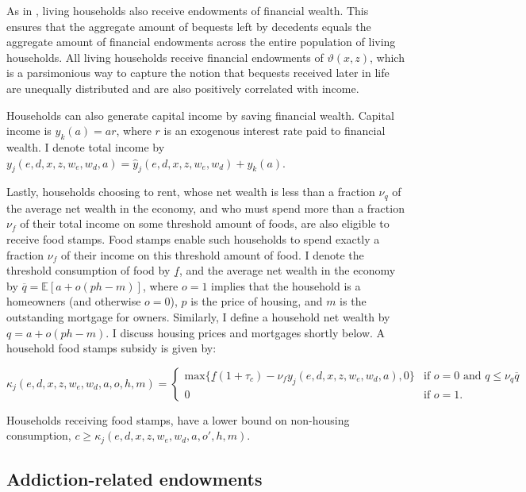 \documentclass[parskip=full]{article}
\begin{document}
As in \citet{kkk-2021}, living households also receive endowments of financial wealth. This ensures that the aggregate amount of bequests left by decedents equals the aggregate amount of financial endowments across the entire population of living households. All living households receive financial endowments of $\vartheta (x,z)$, which is a parsimonious way to capture the notion that bequests received later in life are unequally distributed and are also positively correlated with income.

Households can also generate capital income by saving financial wealth. Capital income is $y_{k}(a)=ar$, where $r$ is an exogenous interest rate paid to financial wealth. I denote total income by $y_{j}(e,d,x,z,w_{e},w_{d},a)=\hat{y}_{j}(e,d,x,z,w_{e},w_{d})+y_{k}(a)$.

Lastly, households choosing to rent, whose net wealth is less than a fraction $\nu_{q}$ of the average net wealth in the economy, and who must spend more than a fraction $\nu_{f}$ of their total income on some threshold amount of foods, are also eligible to receive food stamps. Food stamps enable such households to spend exactly a fraction $\nu_{f}$ of their income on this threshold amount of food. I denote the threshold consumption of food by $\underline{f}$, and the average net wealth in the economy by $\overline{q}=\mathbb{E}[a+o (ph-m)]$, where $o=1$ implies that the household is a homeowners (and otherwise $o=0$), $p$ is the price of housing, and $m$ is the outstanding mortgage for owners. Similarly, I define a household net wealth by $q=a+o(ph-m)$. I discuss housing prices and mortgages shortly below. A household food stamps subsidy is given by:

\begin{equation}
\kappa_{j}(e,d,x,z,w_{e},w_{d},a,o,h,m)=\begin{cases}
\mbox{max}\{\underline{f}(1+\tau_{c})-\nu_{f}y_{j}(e,d,x,z,w_{e},w_{d},a),0\}&\text{if $o=0$ and $q \leq \nu_{q}\overline{q}$} \\
0 &\text{if $o=1$}.
\end{cases}
\end{equation}

\noindent Households receiving food stamps, have a lower bound on non-housing consumption, $c\geq \kappa_{j}(e,d,x,z,w_{e},w_{d},a,o',h,m)$.

\subsection{Addiction-related endowments}\label{sec:addiction_endowments}
\end{document}
